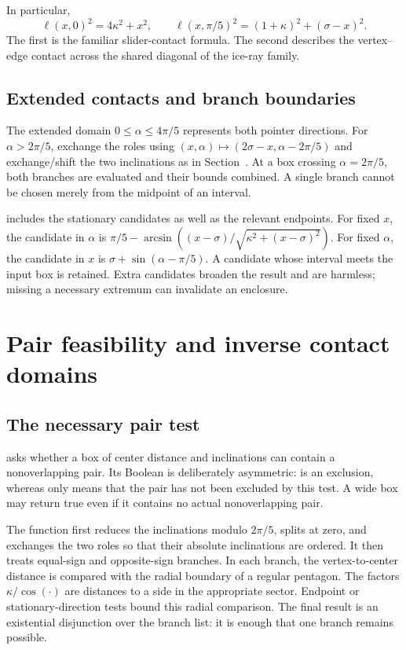 \documentclass[11pt,a4paper]{article}
\newcommand{\code}[1]{\texttt{\detokenize{#1}}}
\theoremstyle{remark}\newtheorem*{contract}{Implementation contract}\newtheorem*{auditnote}{Audit note}
\begin{document}


In particular,
\[
\ell(x,0)^2=4\kappa^2+x^2,
\qquad
\ell(x,\pi/5)^2=(1+\kappa)^2+(\sigma-x)^2.
\]
The first is the familiar slider-contact formula. The second describes the
vertex--edge contact across the shared diagonal of the ice-ray family.

\subsection{Extended contacts and branch boundaries}
The extended domain $0\le\alpha\le4\pi/5$ represents both pointer
directions. For $\alpha>2\pi/5$, exchange the roles using
$(x,\alpha)\mapsto(2\sigma-x,\alpha-2\pi/5)$ and exchange/shift the two
inclinations as in Section~\PaperContactCoordinates. At a box crossing
$\alpha=2\pi/5$, both branches are evaluated and their bounds combined.
A single branch cannot be chosen merely from the midpoint of an interval.

\code{ellxmono_r} includes the stationary candidates as well as the relevant
endpoints. For fixed $x$, the candidate in $\alpha$ is
$\pi/5-\arcsin((x-\sigma)/\sqrt{\kappa^2+(x-\sigma)^2})$.
For fixed $\alpha$, the candidate in $x$ is
$\sigma+\sin(\alpha-\pi/5)$. A candidate whose interval meets the input
box is retained. Extra candidates broaden the result and are harmless;
missing a necessary extremum can invalidate an enclosure.

\section{Pair feasibility and inverse contact domains}

\subsection{The necessary pair test}
\code{Pet.pet} asks whether a box of center distance and inclinations can
contain a nonoverlapping pair. Its Boolean is deliberately asymmetric:
\code{false} is an exclusion, whereas \code{true} only means that the pair
has not been excluded by this test. A wide box may return true even if it
contains no actual nonoverlapping pair.

The function first reduces the inclinations modulo $2\pi/5$, splits at zero,
and exchanges the two roles so that their absolute inclinations are ordered.
It then treats equal-sign and opposite-sign branches. In each branch, the
vertex-to-center distance is compared with the radial boundary of a regular
pentagon. The factors $\kappa/\cos(\cdot)$ are distances to a side in the
appropriate sector. Endpoint or stationary-direction tests bound this radial
comparison. The final result is an existential disjunction over the branch
list: it is enough that one branch remains possible.
\end{document}
